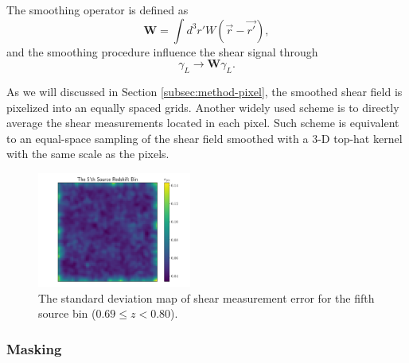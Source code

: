 \documentclass[twocolumn]{aastex62}
\begin{document}
The smoothing operator is defined as
\begin{equation}
\mathbf{W} = \int d^3 r' W(\vec{r}-\vec{r'}),
\end{equation}
and the smoothing procedure influence the shear signal through
\begin{equation}
\gamma_L \rightarrow \mathbf{W} \gamma_L.
\end{equation}

As we will discussed in Section \ref{subsec:method-pixel}, the smoothed shear field is pixelized into an equally spaced
grids. Another widely used scheme is to directly average the shear measurements located in each pixel. Such scheme is 
equivalent to an equal-space sampling of the shear field smoothed with a $3$-D top-hat kernel with the same scale as 
the pixels.


\begin{figure}[!t]
 \centering
 \includegraphics[width=0.45\textwidth]{noise_std_map_pix.pdf}
 \caption{The standard deviation map of shear measurement error for the fifth source bin ($0.69 \leq z < 0.80 $).}
\end{figure}

\subsubsection{Masking}
\label{subsec:method-msknoise}
\end{document}
